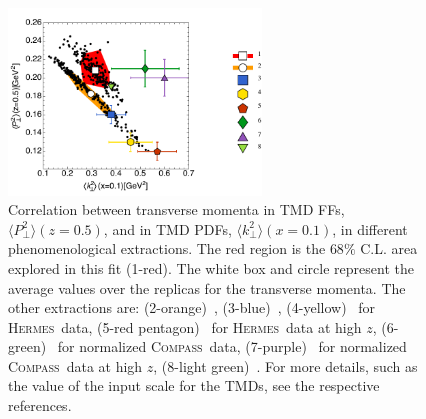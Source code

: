 \documentclass[aps,preprintnumbers,showpacs,nofootinbib,superscriptaddress,floatfix]{revtex4}
\newcommand{\AS}[1]{{\textcolor[rgb]{1,0,1}{#1}}}
\newcommand{\hermes}{\textsc{Hermes}}
\newcommand{\compass}{\textsc{Compass}}
\begin{document}
\begin{figure}[h!]
\begin{center}
\includegraphics[width=0.60\textwidth]{plots/kT2_PT2_flav_indep}
\end{center}
\caption{Correlation between transverse momenta in TMD FFs, $\langle P_\perp^2 \rangle(z=0.5)$, and in TMD PDFs, $\langle k_\perp^2 \rangle(x=0.1)$, in different phenomenological extractions. 
The red region is the $68\%$ C.L. area explored in this fit (1-red). The white \AS{box and circle} represent the average values over the replicas for the transverse momenta. 
The other extractions are: (2-orange)~\cite{Signori:2013mda}, (3-blue)~\cite{Schweitzer:2010tt}, (4-\AS{yellow})~\cite{Anselmino:2013lza} for \hermes\ data, (5-red \AS{pentagon})~\cite{Anselmino:2013lza} for \hermes\ data at high $z$, (6-\AS{green})~\cite{Anselmino:2013lza} for normalized \compass\ data, (7-purple)~\cite{Anselmino:2013lza} for normalized \compass\ data at high $z$, (8-\AS{light green})~\cite{Echevarria:2014xaa}.  
For more details, such as the value of the input scale for the TMDs, see the respective references.} 
\label{f:kT2_vs_PT2}
\end{figure}
\end{document}

